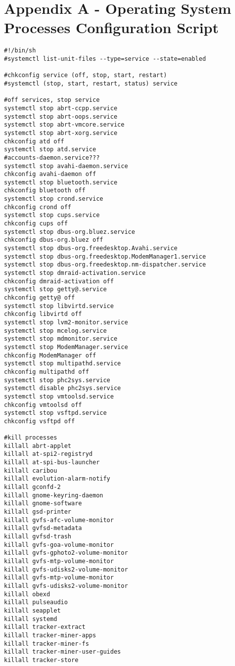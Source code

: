 \section{Appendix A - Operating System Processes Configuration Script}
\label{sec:appendA}
\begin{verbatim}
#!/bin/sh
#systemctl list-unit-files --type=service --state=enabled

#chkconfig service (off, stop, start, restart)
#systemctl (stop, start, restart, status) service

#off services, stop service
systemctl stop abrt-ccpp.service
systemctl stop abrt-oops.service
systemctl stop abrt-vmcore.service
systemctl stop abrt-xorg.service
chkconfig atd off
systemctl stop atd.service
#accounts-daemon.service???
systemctl stop avahi-daemon.service
chkconfig avahi-daemon off
systemctl stop bluetooth.service
chkconfig bluetooth off
systemctl stop crond.service
chkconfig crond off
systemctl stop cups.service
chkconfig cups off
systemctl stop dbus-org.bluez.service
chkconfig dbus-org.bluez off
systemctl stop dbus-org.freedesktop.Avahi.service
systemctl stop dbus-org.freedesktop.ModemManager1.service
systemctl stop dbus-org.freedesktop.nm-dispatcher.service
systemctl stop dmraid-activation.service
chkconfig dmraid-activation off
systemctl stop getty@.service
chkconfig getty@ off
systemctl stop libvirtd.service
chkconfig libvirtd off
systemctl stop lvm2-monitor.service
systemctl stop mcelog.service
systemctl stop mdmonitor.service
systemctl stop ModemManager.service
chkconfig ModemManager off
systemctl stop multipathd.service
chkconfig multipathd off
systemctl stop phc2sys.service
systemctl disable phc2sys.service
systemctl stop vmtoolsd.service
chkconfig vmtoolsd off
systemctl stop vsftpd.service
chkconfig vsftpd off

#kill processes
killall abrt-applet
killall at-spi2-registryd
killall at-spi-bus-launcher
killall caribou
killall evolution-alarm-notify
killall gconfd-2
killall gnome-keyring-daemon
killall gnome-software
killall gsd-printer
killall gvfs-afc-volume-monitor
killall gvfsd-metadata
killall gvfsd-trash
killall gvfs-goa-volume-monitor
killall gvfs-gphoto2-volume-monitor
killall gvfs-mtp-volume-monitor
killall gvfs-udisks2-volume-monitor
killall gvfs-mtp-volume-monitor
killall gvfs-udisks2-volume-monitor
killall obexd
killall pulseaudio
killall seapplet
killall systemd
killall tracker-extract
killall tracker-miner-apps
killall tracker-miner-fs
killall tracker-miner-user-guides
killall tracker-store

\end{verbatim}

